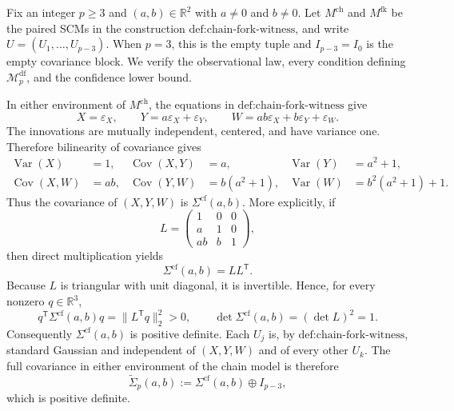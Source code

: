 Fix an integer \(p\geq 3\) and \((a,b)\in\mathbb R^2\) with \(a\neq0\) and \(b\neq0\).  Let \(M^{\mathrm{ch}}\) and \(M^{\mathrm{fk}}\) be the paired SCMs in the construction \(\text{def:chain-fork-witness}\), and write \(U=(U_1,\ldots,U_{p-3})\).  When \(p=3\), this is the empty tuple and \(I_{p-3}=I_0\) is the empty covariance block.  We verify the observational law, every condition defining \(\mathcal M_p^{\mathrm{df}}\), and the confidence lower bound.

In either environment of \(M^{\mathrm{ch}}\), the equations in \(\text{def:chain-fork-witness}\) give
\[
 X=\varepsilon_X,\qquad
 Y=a\varepsilon_X+\varepsilon_Y,
 \qquad
 W=ab\varepsilon_X+b\varepsilon_Y+\varepsilon_W.
\]
The innovations are mutually independent, centered, and have variance one.  Therefore bilinearity of covariance gives
\[
\begin{aligned}
 \operatorname{Var}(X)&=1,
 &\operatorname{Cov}(X,Y)&=a,
 &\operatorname{Var}(Y)&=a^2+1,\\
 \operatorname{Cov}(X,W)&=ab,
 &\operatorname{Cov}(Y,W)&=b(a^2+1),
 &\operatorname{Var}(W)&=b^2(a^2+1)+1.
\end{aligned}
\]
Thus the covariance of \((X,Y,W)\) is \(\Sigma^{\mathrm{cf}}(a,b)\).  More explicitly, if
\[
 L=\begin{pmatrix}
 1&0&0\\
 a&1&0\\
 ab&b&1
 \end{pmatrix},
\]
then direct multiplication yields
\[
 \Sigma^{\mathrm{cf}}(a,b)=LL^{\mathsf T}.
\]
Because \(L\) is triangular with unit diagonal, it is invertible.  Hence, for every nonzero \(q\in\mathbb R^3\),
\[
 q^{\mathsf T}\Sigma^{\mathrm{cf}}(a,b)q
 =\lVert L^{\mathsf T}q\rVert_2^2>0,
 \qquad
 \det\Sigma^{\mathrm{cf}}(a,b)=(\det L)^2=1.
\]
Consequently \(\Sigma^{\mathrm{cf}}(a,b)\) is positive definite.  Each \(U_j\) is, by \(\text{def:chain-fork-witness}\), standard Gaussian and independent of \((X,Y,W)\) and of every other \(U_k\).  The full covariance in either environment of the chain model is therefore
\[
 \widetilde\Sigma_p(a,b)
 :=\Sigma^{\mathrm{cf}}(a,b)\oplus I_{p-3},
\]
which is positive definite.

